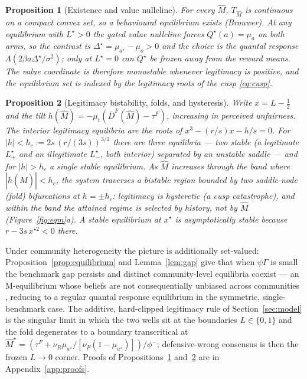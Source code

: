 \documentclass[11pt]{article}
\newtheorem{proposition}{Proposition}
\newcommand{\1}{\mathbf{1}}
\begin{document}
\begin{proposition}[Existence and value nullcline]
\label{prop:existence}
For every $\hat M$, $T_{\hat M}$ is continuous on a compact convex set, so a
behavioural equilibrium exists (Brouwer). At any equilibrium with $L^\star>0$ the
gated value nullcline forces $Q^\star(a)=\mu_a$ on both arms, so the contrast is
$\Delta^\star=\mu_{a^\star}-\mu_o>0$ and the choice is the quantal response
$\Lambda(2\beta a\Delta^\star/\sigma^2)$; only at $L^\star=0$ can $Q^\star$ be
frozen away from the reward means. The value coordinate is therefore monostable
whenever legitimacy is positive, and the equilibrium set is indexed by the
legitimacy roots of the cusp \eqref{eq:cusp}.
\end{proposition}

\begin{proposition}[Legitimacy bistability, folds, and hysteresis]
\label{prop:hysteresis}
Write $x=L-\tfrac12$ and the tilt $h(\hat M)=-\mu_{\mathrm t}(\bar D^F(\hat M)-\tau^F)$,
increasing in perceived unfairness. The interior legitimacy equilibria are the
roots of $x^3-(r/s)x-h/s=0$. For $|h|<h_c:=2s\,(r/(3s))^{3/2}$ there are
\emph{three} equilibria --- two stable (a legitimate $L^\star_+$ and an
illegitimate $L^\star_-$, both interior) separated by an unstable saddle --- and
for $|h|>h_c$ a single stable equilibrium. As $\hat M$ increases through the band
where $|h(\hat M)|<h_c$, the system traverses a bistable region bounded by two
saddle-node (fold) bifurcations at $h=\pm h_c$: legitimacy is \emph{hysteretic}
(a cusp catastrophe), and within the band the attained regime is selected by
history, not by $\hat M$ (Figure~\ref{fig:eqm}a). A stable equilibrium at
$x^\star$ is asymptotically stable because $r-3s\,x^{\star2}<0$ there.
\end{proposition}

\noindent Under community heterogeneity the picture is additionally set-valued:
Proposition~\ref{prop:equilibrium} and Lemma~\ref{lem:gap} give that when
$\psi\Gamma$ is small the benchmark gap persists and distinct community-level
equilibria coexist --- an M-equilibrium whose beliefs are not consequentially
unbiased across communities \citep{GoereeLouis2021}, reducing to a regular quantal
response equilibrium \citep{McKelveyPalfrey1995} in the symmetric,
single-benchmark case. The additive, hard-clipped legitimacy rule of
Section~\ref{sec:model} is the singular limit in which the two wells sit at the
boundaries $L\in\{0,1\}$ and the fold degenerates to a boundary transcritical at
$\hat M^\star=(\tau^F+\nu_R\mu_{a^\star}/[\nu_F(1-\mu_{a^\star})])/\phi^-$;
defensive-wrong consensus is then the frozen $L\!\to\!0$ corner. Proofs of
Propositions~\ref{prop:existence} and~\ref{prop:hysteresis} are in
Appendix~\ref{app:proofs}.
\end{document}
